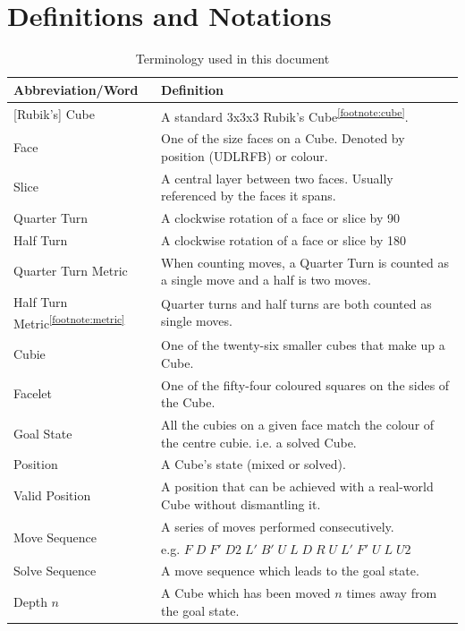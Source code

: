\documentclass{report}
\begin{document}
	\chapter{Definitions and Notations}
	\begin{table}[htbp]
		\def\arraystretch{1.2}
		\centering
		\caption{Terminology used in this document}
		\label{tab:abbrev}
		\begin{tabular}{m{}m{}}
			\toprule
			\textbf{Abbreviation/Word} & \textbf{Definition} \\
			\midrule
			{[Rubik's]} Cube 		& 	A standard 3x3x3 Rubik's Cube\textsuperscript{\ref{footnote:cube}}. \\
			Face 				& 	One of the size faces on a Cube. Denoted by position (UDLRFB) or colour.\\
			Slice				&	A central layer between two faces. Usually referenced by the faces it spans. \\
			Quarter Turn		&	A clockwise rotation of a face or slice by 90\degree \\
			Half Turn			&	A clockwise rotation of a face or slice by 180\degree \\
			Quarter Turn Metric	&	When counting moves, a Quarter Turn is counted as a single move and a half is two moves. \\
			Half Turn Metric\textsuperscript{\ref{footnote:metric}}	&	Quarter turns and half turns are both counted as single moves. \\
			Cubie				&	One of the twenty-six smaller cubes that make up a Cube. \\
			Facelet				&	One of the fifty-four coloured squares on the sides of the Cube. \\
			Goal State			&	All the cubies on a given face match the colour of the centre cubie. i.e. a solved Cube. \\
			Position			&	A Cube's state (mixed or solved). \\
			Valid Position		&	A position that can be achieved with a real-world Cube without dismantling it. \\
			\multirow{ 2}{*}{Move Sequence}		&	A series of moves performed consecutively. \\
			&	e.g. $F\;D\;F'\;D2\;L'\;B'\;U\;L\;D\;R\;U\;L'\;F'\;U\;L\;U2$ \\
			Solve Sequence		&	A move sequence which leads to the goal state. \\
			Depth $n$			&	A Cube which has been moved $n$ times away from the goal state. \\
			\bottomrule
		\end{tabular}
	\end{table}
\end{document}
